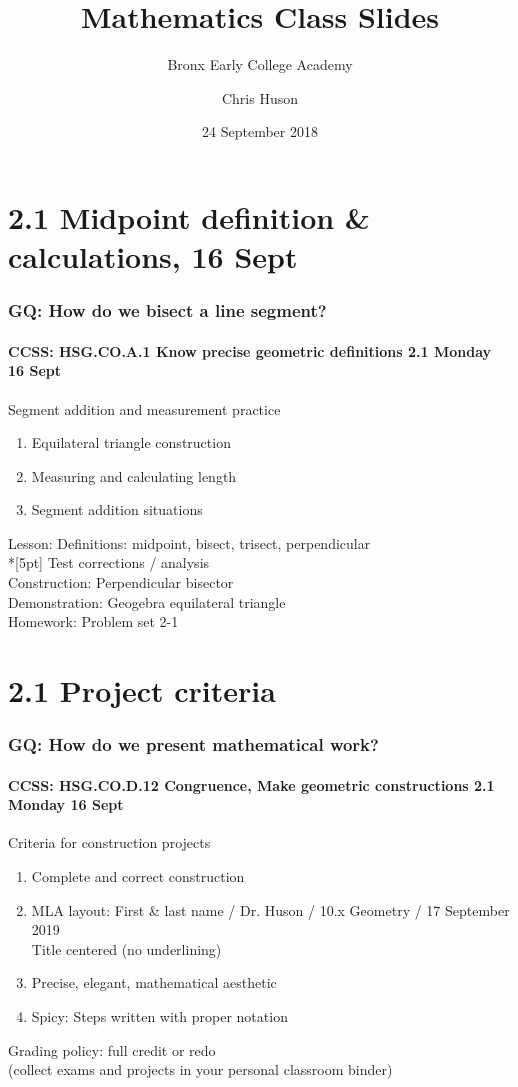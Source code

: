 \documentclass{beamer}
\title{Mathematics Class Slides}
\subtitle{Bronx Early College Academy}
\author{Chris Huson}
\date{24 September 2018}
\begin{document}
\frame{\titlepage}
\section[Outline]{}
\frame{\tableofcontents}

\section{2.1 Midpoint definition \& calculations, 16 Sept}
  \frame
  {
    \frametitle{GQ: How do we bisect a line segment?}
    \framesubtitle{CCSS: HSG.CO.A.1 Know precise geometric definitions \hfill \alert{2.1 Monday 16 Sept}}

    \begin{block}{Segment addition and measurement practice}
    \begin{enumerate}
      \item Equilateral triangle construction
      \item Measuring and calculating length
      \item Segment addition situations
    \end{enumerate}
    \end{block}
    Lesson: Definitions: midpoint, bisect, trisect, perpendicular \\*[5pt]
    Test corrections / analysis\\
    Construction: Perpendicular bisector\\
    Demonstration: Geogebra equilateral triangle\\ \smallskip
    Homework: Problem set 2-1 
  }

\section{2.1 Project criteria}
  \frame
  {
    \frametitle{GQ: How do we present mathematical work?}
    \framesubtitle{CCSS: HSG.CO.D.12 Congruence, Make geometric constructions  \hfill \alert{2.1 Monday 16 Sept}}

    \begin{block}{Criteria for construction projects}
    \begin{enumerate}
        \item Complete and correct construction
        \item MLA layout: First \& last name / Dr. Huson / 10.x Geometry / 17 September 2019 \\
        Title centered (no underlining)
        \item Precise, elegant, mathematical aesthetic
        \item Spicy: Steps written with proper notation
    \end{enumerate}
    \end{block}
    Grading policy: full credit or redo\\[5pt]
    (collect exams and projects in your personal classroom binder)
  }
\end{document}
